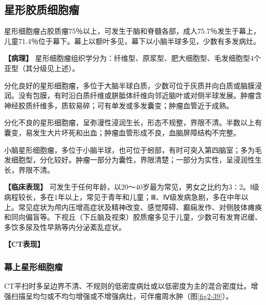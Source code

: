 \subsection{星形胶质细胞瘤}

星形细胞瘤占胶质瘤75％以上，可发生于脑和脊髓各部，成人75.7％发生于幕上，儿童71.4％位于幕下。幕上以额叶多见，幕下以小脑半球多见，少数有多发病灶。

\textbf{【病理】}
星形细胞瘤组织学分为：纤维型、原浆型、肥大细胞型、毛发细胞型4个亚型（其分级见上述）。

分化良好的星形细胞瘤，多位于大脑半球白质，少数可位于灰质并向白质或脑膜浸润。没有包膜，有时沿白质纤维或胼胝体纤维向邻近脑叶或对侧半球发展。肿瘤含神经胶质纤维多，质软易碎；可有单发或多发囊变；肿瘤血管近于成熟。

分化不良的星形细胞瘤，呈弥漫性浸润生长，形态不规整，界限不清。半数以上有囊变，易发生大片坏死和出血；肿瘤血管形成不良，血脑屏障结构不完整。

小脑星形细胞瘤，多位于小脑半球，也可位于蚓部，有时可突入第四脑室；多为毛发细胞型，分化较好。肿瘤一部分为囊性，界限清楚；一部分为实性，呈浸润性生长，界限不清。

\textbf{【临床表现】}
可发生于任何年龄，以20～40岁最为常见，男女之比约为3∶2。Ⅰ级病程较长，多在1年以上，常见于青年和儿童；Ⅲ、Ⅳ级发病急剧，多在中年以上。常见症状为颅内压增高症状及精神改变、感觉障碍、癫痫发作、对侧肢体瘫痪和同向偏盲等。下视丘（下丘脑及视束）胶质瘤多见于儿童，少数可有发育迟缓、多饮多尿及性早熟等内分泌紊乱症状。

\textbf{【CT表现】}

\subsubsection{幕上星形细胞瘤}

CT平扫时多呈边界不清、不规则的低密度病灶或以低密度为主的混合密度灶。增强扫描呈均匀或不均匀增强或不增强病灶，可伴瘤周水肿（图\ref{fig2-39}）。



